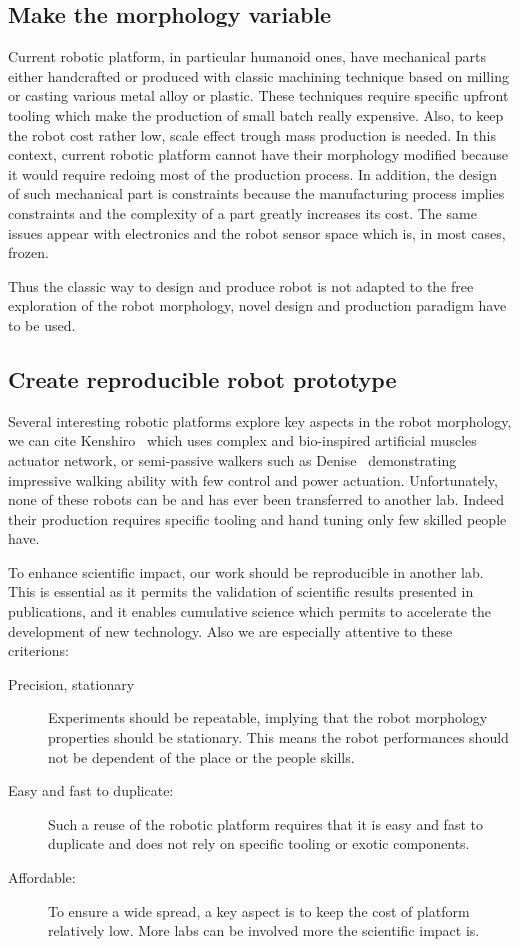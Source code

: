 \subsection{Make the morphology variable} %

Current robotic platform, in particular humanoid ones, have mechanical parts either handcrafted or produced with classic machining technique based on milling or casting various metal alloy or plastic.
These techniques require specific upfront tooling which make the production of small batch really expensive. Also, to keep the robot cost rather low, scale effect trough mass production is needed. In this context, current robotic platform cannot have their morphology modified because it would require redoing most of the production process. In addition, the design of such mechanical part is constraints because the manufacturing process implies constraints and the complexity of a part greatly increases its cost. The same issues appear with electronics and the robot sensor space which is, in most cases, frozen.

Thus the classic way to design and produce robot is not adapted to the free exploration of the robot morphology, novel design and production paradigm have to be used.

\subsection{Create reproducible robot prototype} %

Several interesting robotic platforms explore key aspects in the robot morphology, we can cite Kenshiro~\cite{REF} which uses complex and bio-inspired artificial muscles actuator network, or semi-passive walkers such as Denise~\cite{REF} demonstrating impressive walking ability with few control and power actuation. Unfortunately, none of these robots can be and has ever been transferred to another lab. Indeed their production requires specific tooling and hand tuning only few skilled people have.

To enhance scientific impact, our work should be reproducible in another lab. This is essential as it permits the validation of scientific results presented in publications, and it enables cumulative science which permits to accelerate the development of new technology. Also we are especially attentive to these criterions:

\begin{description}
    \item[Precision, stationary] Experiments should be repeatable, implying that the robot morphology properties should be stationary. This means the robot performances should not be dependent of the place or the people skills.
    \item[Easy and fast to duplicate:] Such a reuse of the robotic platform requires that it is easy and fast to duplicate and does not rely on specific tooling or exotic components.
    \item[Affordable:] To ensure a wide spread, a key aspect is to keep the cost of platform relatively low. More labs can be involved more the scientific impact is.
\end{description}

